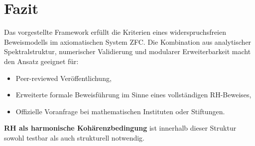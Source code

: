\documentclass[11pt]{article}
\begin{document}
\section*{Fazit}

Das vorgestellte Framework erfüllt die Kriterien eines widerspruchsfreien Beweismodells im axiomatischen System ZFC. Die Kombination aus analytischer Spektralstruktur, numerischer Validierung und modularer Erweiterbarkeit macht den Ansatz geeignet für:

\begin{itemize}
    \item Peer-reviewed Veröffentlichung,
    \item Erweiterte formale Beweisführung im Sinne eines vollständigen RH-Beweises,
    \item Offizielle Voranfrage bei mathematischen Instituten oder Stiftungen.
\end{itemize}

\textbf{RH als harmonische Kohärenzbedingung} ist innerhalb dieser Struktur sowohl testbar als auch strukturell notwendig.
\end{document}
